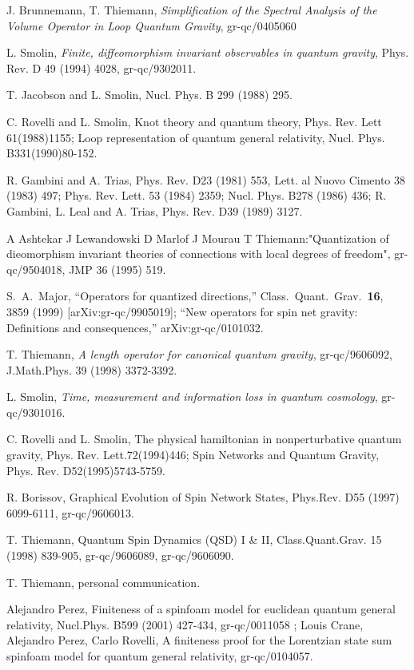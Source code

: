 \documentclass[12pt]{article}
\begin{document}
\begin{thebibliography}{0}
{{{J.  Brunnemann, T. Thiemann,
{\it Simplification of the Spectral Analysis of the Volume Operator in Loop Quantum Gravity}, 
gr-qc/0405060  


L. Smolin, {\it
Finite, diffeomorphism invariant observables in quantum gravity},
Phys. Rev. D 49 (1994) 4028, gr-qc/9302011.

T. Jacobson and L. Smolin, Nucl. Phys. B 299 (1988) 295.

C. Rovelli and L. Smolin, Knot theory and quantum theory,
Phys. Rev. Lett
61(1988)1155; Loop representation of quantum general relativity, Nucl. Phys.
B331(1990)80-152.

R. Gambini and A. Trias, Phys. Rev. D23 (1981) 553,
Lett. al Nuovo Cimento
38 (1983) 497; Phys. Rev. Lett. 53 (1984) 2359; Nucl. Phys. B278
(1986) 436; R. Gambini, L. Leal and A. Trias, Phys. Rev. D39 (1989) 3127.

A Ashtekar J Lewandowski D Marlof J Mourau
T Thiemann:"Quantization of dieomorphism invariant theories of connections
with local
degrees of freedom", gr-qc/9504018, JMP 36 (1995) 519.


S.~A.~Major,
``Operators for quantized directions,''
Class.\ Quant.\ Grav.\  {\bf 16}, 3859 (1999)
[arXiv:gr-qc/9905019];
``New operators for spin net gravity: Definitions and consequences,''
arXiv:gr-qc/0101032.

T. Thiemann, 
{\it A length operator for canonical quantum gravity}, 
gr-qc/9606092,  J.Math.Phys. 39 (1998) 3372-3392. 

L. Smolin,
{\it Time, measurement and information loss in quantum cosmology},
gr-qc/9301016.

C. Rovelli and L. Smolin, The physical hamiltonian in
nonperturbative
quantum gravity,
Phys. Rev. Lett.72(1994)446; Spin Networks and Quantum Gravity, Phys. Rev.
D52(1995)5743-5759.

R. Borissov, Graphical Evolution of Spin Network
States, Phys.Rev. D55 (1997) 6099-6111, gr-qc/9606013.

T. Thiemann, Quantum Spin Dynamics (QSD) I \& II,
Class.Quant.Grav. 15 (1998) 839-905, gr-qc/9606089,
gr-qc/9606090.


T. Thiemann, personal communication.

Alejandro Perez,
 Finiteness of a spinfoam model for euclidean quantum general
 relativity, Nucl.Phys. B599 (2001) 427-434, gr-qc/0011058 ;
Louis Crane, Alejandro Perez, Carlo Rovelli,
A finiteness proof for the Lorentzian state sum spinfoam model for quantum general relativity,
gr-qc/0104057.

}}}
\end{thebibliography}
\end{document}
